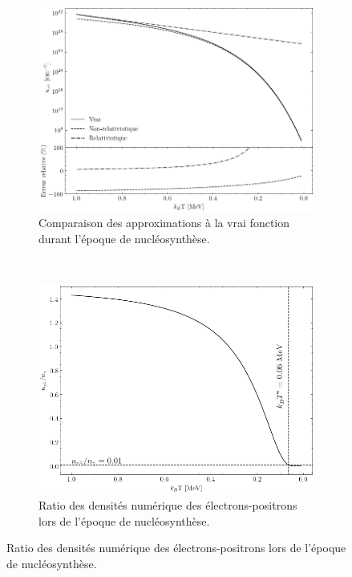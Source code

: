 \documentclass{article}
\numberwithin{equation}{section}
\begin{document}
\begin{figure}[H]
        \centering
        \begin{subfigure}[t]{0.45\textwidth}
                \includegraphics[width=\textwidth]{nucleosynthesis_electron_density}
                \caption{Comparaison des approximations à la vrai fonction durant l'époque de 
                nucléosynthèse.}
                \label{fig:Comparaison}
        \end{subfigure}
        ~
        \begin{subfigure}[t]{0.45\textwidth}
                \includegraphics[width=\textwidth]{resultat_ratio_ne_ngamma}
                \caption{Ratio des densités numérique des électrons-positrons 
                lors de l'époque de nucléosynthèse.}
                \label{fig:Res1}
        \end{subfigure}
\end{figure}
\end{document}
